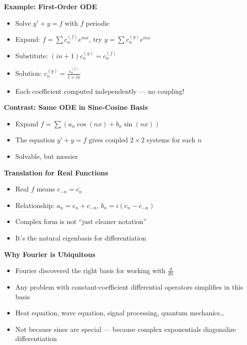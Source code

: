 \documentclass[
  10pt,
  letterpaper,
]{scrbook}
\providecommand{\tightlist}{%
  \setlength{\itemsep}{0pt}\setlength{\parskip}{0pt}}
\begin{document}
\textbf{Example: First-Order ODE}

\begin{itemize}
\tightlist
\item
  Solve \(y' + y = f\) with \(f\) periodic
\item
  Expand: \(f = \sum c_n^{(f)} e^{inx}\), try
  \(y = \sum c_n^{(y)} e^{inx}\)
\item
  Substitute: \((in + 1)c_n^{(y)} = c_n^{(f)}\)
\item
  Solution: \(c_n^{(y)} = \frac{c_n^{(f)}}{1 + in}\)
\item
  Each coefficient computed independently --- no coupling!
\end{itemize}

\textbf{Contrast: Same ODE in Sine-Cosine Basis}

\begin{itemize}
\tightlist
\item
  Expand \(f = \sum(a_n \cos(nx) + b_n \sin(nx))\)
\item
  The equation \(y' + y = f\) gives coupled \(2 \times 2\) systems for
  each \(n\)
\item
  Solvable, but messier
\end{itemize}

\textbf{Translation for Real Functions}

\begin{itemize}
\tightlist
\item
  Real \(f\) means \(c_{-n} = \overline{c_n}\)
\item
  Relationship: \(a_n = c_n + c_{-n}\), \(b_n = i(c_n - c_{-n})\)
\item
  Complex form is not ``just cleaner notation''
\item
  It's the natural eigenbasis for differentiation
\end{itemize}

\textbf{Why Fourier is Ubiquitous}

\begin{itemize}
\tightlist
\item
  Fourier discovered the right basis for working with \(\frac{d}{dx}\)
\item
  Any problem with constant-coefficient differential operators
  simplifies in this basis
\item
  Heat equation, wave equation, signal processing, quantum
  mechanics\ldots{}
\item
  Not because sines are special --- because complex exponentials
  diagonalize differentiation
\end{itemize}
\end{document}

